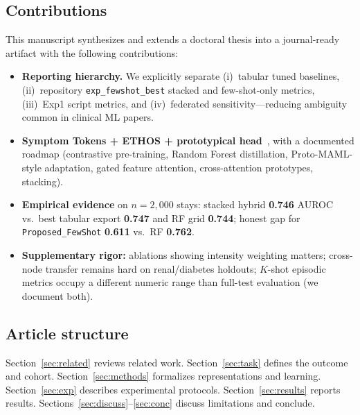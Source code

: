 \subsection{Contributions}
This manuscript synthesizes and extends a doctoral thesis into a journal-ready artifact with the following contributions:
\begin{itemize}
  \item \textbf{Reporting hierarchy.} We explicitly separate (i)~tabular tuned baselines, (ii)~repository \texttt{exp\_fewshot\_best} stacked and few-shot-only metrics, (iii)~Exp1 script metrics, and (iv)~federated sensitivity---reducing ambiguity common in clinical ML papers.
  \item \textbf{Symptom Tokens + ETHOS + prototypical head}~\citep{sharafi2023ethos,vaswani2017attention,snell2017prototypical}, with a documented roadmap (contrastive pre-training, Random Forest distillation, Proto-MAML-style adaptation, gated feature attention, cross-attention prototypes, stacking).
  \item \textbf{Empirical evidence} on $n{=}2{,}000$ stays: stacked hybrid \textbf{0.746} AUROC vs.\ best tabular export \textbf{0.747} and RF grid \textbf{0.744}; honest gap for \texttt{Proposed\_FewShot} \textbf{0.611} vs.\ RF \textbf{0.762}.
  \item \textbf{Supplementary rigor:} ablations showing intensity weighting matters; cross-node transfer remains hard on renal/diabetes holdouts; $K$-shot episodic metrics occupy a different numeric range than full-test evaluation (we document both).
\end{itemize}

\subsection{Article structure}
Section~\ref{sec:related} reviews related work. Section~\ref{sec:task} defines the outcome and cohort. Section~\ref{sec:methods} formalizes representations and learning. Section~\ref{sec:exp} describes experimental protocols. Section~\ref{sec:results} reports results. Sections~\ref{sec:discuss}--\ref{sec:conc} discuss limitations and conclude.
